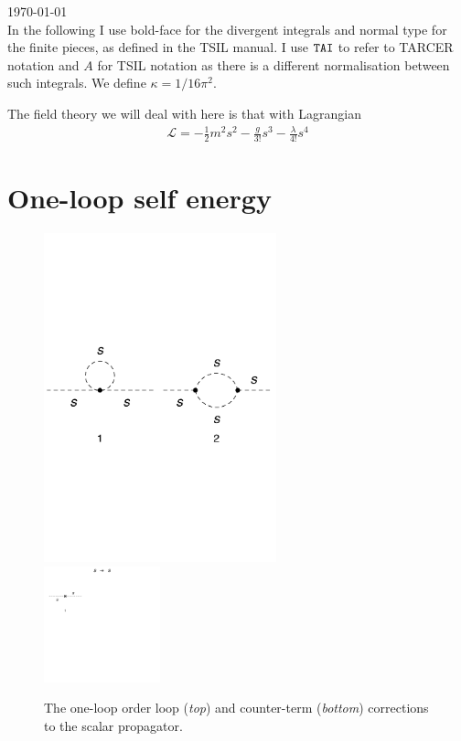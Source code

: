 \documentclass[11pt]{article}
\begin{document}
\today\\

In the following I use bold-face for the divergent integrals and normal type for the finite pieces, as defined in the TSIL manual.  I use $\tt{TAI}$ to refer to TARCER notation and $A$ for TSIL notation as there is a different normalisation between such integrals.  We define $\kappa = 1/16\pi^2$.

The field theory we will deal with here is that with Lagrangian
\begin{align}
\mathcal{L} = -\frac{1}{2}m^2s^2-\frac{g}{3!}s^3-\frac{\lambda}{4!}s^4
\end{align}


\section{One-loop self energy}
\begin{figure}[h!]
\center
\includegraphics[width=0.6\textwidth]{1loop.pdf}\\
\includegraphics[width=0.3\textwidth]{1loop_1c.pdf}
\caption{The one-loop order loop (\textit{top}) and counter-term (\textit{bottom}) corrections to the scalar propagator.}\label{fig:1loop}
\end{figure}
\end{document}

